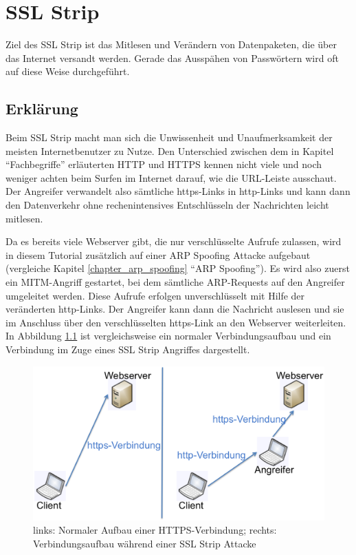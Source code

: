 \chapter{SSL Strip}
Ziel des SSL Strip ist das Mitlesen und Verändern von Datenpaketen, die über das Internet versandt werden. Gerade das Ausspähen von Passwörtern wird oft auf diese Weise durchgeführt.

\section{Erklärung}
Beim SSL Strip macht man sich die Unwissenheit und Unaufmerksamkeit der meisten Internetbenutzer zu Nutze. Den Unterschied zwischen dem in Kapitel \enquote{Fachbegriffe} erläuterten HTTP und HTTPS kennen nicht viele und noch weniger achten beim Surfen im Internet darauf, wie die URL-Leiste ausschaut. Der Angreifer verwandelt also sämtliche https-Links in http-Links und kann dann den Datenverkehr ohne rechenintensives Entschlüsseln der Nachrichten leicht mitlesen.

Da es bereits viele Webserver gibt, die nur verschlüsselte Aufrufe zulassen, wird in diesem Tutorial zusätzlich auf einer ARP Spoofing Attacke aufgebaut (vergleiche Kapitel \ref{chapter_arp_spoofing} \enquote{ARP Spoofing}). Es wird also zuerst ein MITM-Angriff gestartet, bei dem sämtliche ARP-Requests auf den Angreifer umgeleitet werden. Diese Aufrufe erfolgen unverschlüsselt mit Hilfe der veränderten http-Links. Der Angreifer kann dann die Nachricht auslesen und sie im Anschluss über den verschlüsselten https-Link an den Webserver weiterleiten. In Abbildung \ref{fig:sslstrip} ist vergleichsweise ein normaler Verbindungsaufbau und ein Verbindung im Zuge eines SSL Strip Angriffes dargestellt.

\begin{figure}
	\centering
	\includegraphics[width=\textwidth]{images/sslstrip/SSLStrip}
	\caption{links: Normaler Aufbau einer HTTPS-Verbindung; rechts: Verbindungsaufbau während einer SSL Strip Attacke}
	\label{fig:sslstrip}
\end{figure}

